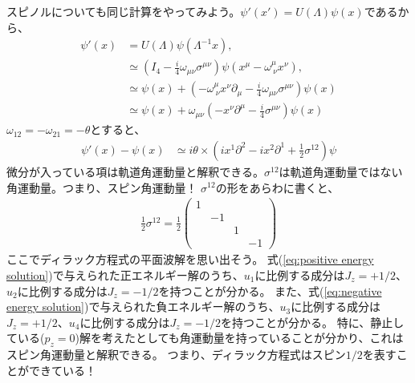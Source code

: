 \documentclass[10pt,a4paper]{jarticle}
\begin{document}
スピノルについても同じ計算をやってみよう。$\psi'(x') = U(\Lambda) \psi(x)$であるから、
\begin{align}
\psi'(x) &= U(\Lambda) \psi(\Lambda^{-1} x), \nonumber\\
 &\simeq \left( I_4  - \frac{i}{4} \omega_{\mu\nu} \sigma^{\mu\nu} \right) \psi(x^\mu - \omega^{\mu}_{~\nu} x^\nu), \nonumber\\
&\simeq \psi(x) + \left( - \omega^{\mu}_{~\nu} x^\nu \partial_\mu - \frac{i}{4} \omega_{\mu\nu} \sigma^{\mu\nu} \right) \psi(x) \nonumber\\
&\simeq \psi(x) + \omega_{\mu\nu} \left( - x^\nu \partial^\mu - \frac{i}{4} \sigma^{\mu\nu} \right) \psi(x)
\end{align}
%
$\omega_{12} = -\omega_{21} = -\theta$とすると、
\begin{align}
\psi'(x) - \psi(x)
&\simeq
i\theta \times  \left( ix^1 \partial^2 - ix^2 \partial^1 + \frac{1}{2}\sigma^{12} \right) \psi
\end{align}
%
微分が入っている項は軌道角運動量と解釈できる。$\sigma^{12}$は軌道角運動量ではない角運動量。つまり、スピン角運動量！
$\sigma^{12}$の形をあらわに書くと、
\begin{align}
\frac{1}{2}\sigma^{12} = \frac{1}{2} \left(\begin{array}{cccc}
1 &&&\\
& -1 &&\\
&& 1 &\\
&&& -1
\end{array}\right)
\end{align}
ここでディラック方程式の平面波解を思い出そう。
式(\ref{eq:positive energy solution})で与えられた正エネルギー解のうち、$u_1$に比例する成分は$J_z = +1/2$、$u_2$に比例する成分は$J_z = -1/2$を持つことが分かる。
また、式(\ref{eq:negative energy solution})で与えられた負エネルギー解のうち、$u_3$に比例する成分は$J_z = +1/2$、$u_4$に比例する成分は$J_z = -1/2$を持つことが分かる。
特に、静止している($p_z = 0$)解を考えたとしても角運動量を持っていることが分かり、これはスピン角運動量と解釈できる。
つまり、ディラック方程式はスピン$1/2$を表すことができている！
\end{document}
